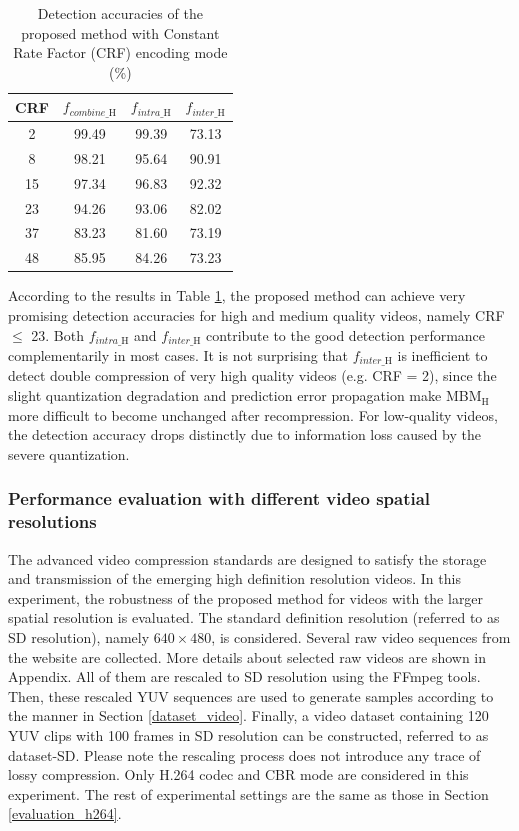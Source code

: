 \documentclass[journal,sort]{IEEEtran}
\begin{document}
\begin{table}[htbp]
	\centering
	\caption{Detection accuracies of the proposed method with Constant Rate Factor (CRF) encoding mode (\%)}
	\begin{tabular}{cccc}
		\toprule
		CRF & $f_{combine\_\text{H}}$ & $f_{intra\_\text{H}}$ & $f_{inter\_\text{H}}$    \\
		\midrule
		2  & 99.49  & 99.39 & 73.13   \\
		8  & 98.21  & 95.64 & 90.91   \\
		15 & 97.34  & 96.83 & 92.32   \\
		23 & 94.26  & 93.06 & 82.02   \\
		37 & 83.23  & 81.60 & 73.19   \\
		48 & 85.95  & 84.26 & 73.23   \\
		\bottomrule
	\end{tabular}%
	\label{tab:crf}%
\end{table}%

According to the results in Table \ref{tab:crf}, the proposed method can achieve very promising detection accuracies for high and medium quality videos, namely CRF $\leq$ 23. Both $f_{intra\_\text{H}}$ and $f_{inter\_\text{H}}$ contribute to the good detection performance complementarily in most cases. It is not surprising that $f_{inter\_\text{H}}$ is inefficient to detect double compression of very high quality videos (e.g. CRF = 2), since the slight quantization degradation and prediction error propagation make MBM$_\text{H}$ more difficult to become unchanged after recompression. For low-quality videos, the detection accuracy drops distinctly due to information loss caused by the severe quantization.


\subsubsection{Performance evaluation with different video spatial resolutions}
The advanced video compression standards are designed to satisfy the storage and transmission of the emerging high definition resolution videos. In this experiment, the robustness of the proposed method for videos with the larger spatial resolution is evaluated. The standard definition resolution (referred to as SD resolution), namely $640\times480$, is considered. Several raw video sequences from the website are collected. More details about selected raw videos are shown in Appendix. All of them are rescaled to SD resolution using the FFmpeg tools. Then, these rescaled YUV sequences are used to generate samples according to the manner in Section \ref{dataset_video}. Finally, a video dataset containing 120 YUV clips with 100 frames in SD resolution can be constructed, referred to as dataset-SD. Please note the rescaling process does not introduce any trace of lossy compression. Only H.264 codec and CBR mode are considered in this experiment. The rest of experimental settings are the same as those in Section \ref{evaluation_h264}.
\end{document}
